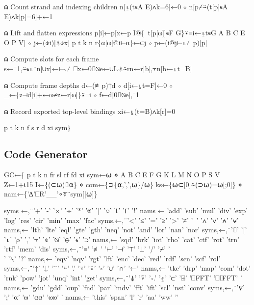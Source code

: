 \documentclass{article}%
\begin{document}
⍝ Count strand and indexing children
   n[⍸(t∊A E)∧k=6]←0 ⋄ n[p⌿⍨(t[p]∊A E)∧k[p]=6]+←1

⍝ Lift and flatten expressions
   p[i]←p[x←p I@\{~t[p[⍵]]∊F G\}⍣≡i←⍸t∊G A B C E O P V] ⋄ j←(⌽i)[⍋⌽x]
   p t k n r\{⍺[⍵]@i⊢⍺\}←⊂j ⋄ p←(i@j⊢⍳≢p)[p]

⍝ Compute slots for each frame
   s←¯1,⍨∊⍳¨n[∪x]←⊢∘≢⌸x←0⌷⍉e←∪I∘⍋⍨rn←r[b],⍪n[b←⍸t=B]

⍝ Compute frame depths
   d←(≢p)↑d ⋄ d[i←⍸t=F]←0 ⋄ _←\{z⊣d[i]+←⍵≠z←r[⍵]\}⍣≡i ⋄ f←d[0⌷⍉e],¯1

⍝ Record exported top-level bindings
   xi←⍸(t=B)∧k[r]=0

   p t k n f s r d xi sym\}
\nwendcode{}\nwdocspar

\subsection{Code Generator}

\nwenddocs{}\endmoddef\nwstartdeflinemarkup{}\nwenddeflinemarkup
GC←\{
  p t k n fr sl rf fd xi sym←⍵ ⋄ A B C E F G K L M N O P S V Z←1+⍳15
  I←\{(⊂⍵)⌷⍺\} ⋄ com←\{⊃\{⍺,',',⍵\}/⍵\}
  ks←\{⍵⊂[0]⍨(⊃⍵)=⍵[;0]\} ⋄ nam←\{'∆'⎕R'__'∘⍕¨sym[|⍵]\}

  syms ←,¨'+'    '-'    '×'   '÷'   '*'   '⍟'   '|'    '○'     '⌊'    '⌈'   '!'
  nams ←  'add'  'sub'  'mul' 'div' 'exp' 'log' 'res'  'cir'   'min'  'max' 'fac'
  syms,←,¨'<'    '≤'    '='   '≥'   '>'   '≠'   '~'    '∧'     '∨'    '⍲'   '⍱'
  nams,←  'lth'  'lte'  'eql' 'gte' 'gth' 'neq' 'not'  'and'   'lor'  'nan' 'nor'
  syms,←,¨'⌷'    '['    '⍳'   '⍴'   ','   '⍪'   '⌽'    '⍉'     '⊖'    '∊'   '⊃'
  nams,←  'sqd'  'brk'  'iot' 'rho' 'cat' 'ctf' 'rot'  'trn'   'rtf'  'mem' 'dis'
  syms,←,¨'≡'    '≢'    '⊢'   '⊣'   '⊤'   '⊥'   '/'    '⌿'     '\\'    '⍀'   '?'
  nams,←  'eqv'  'nqv'  'rgt' 'lft' 'enc' 'dec' 'red'  'rdf'   'scn'  'scf' 'rol'
  syms,←,¨'↑'    '↓'    '¨'   '⍨'   '.'   '⍤'   '⍣'    '∘'     '∪'    '∩'   '←'
  nams,←  'tke'  'drp'  'map' 'com' 'dot' 'rnk' 'pow'  'jot'   'unq'  'int' 'get'
  syms,←,¨'⍋'    '⍒'    '∘.'  '⍷'   '⊂'   '⌹'   '⎕FFT' '⎕IFFT' '%
  nams,←  'gdu'  'gdd'  'oup' 'fnd' 'par' 'mdv' 'fft'  'ift'   'scl'  'nst' 'conv'
  syms,←,¨'∇'    ';'    '⍺'   '⍵'   '⍺⍺'  '⍵⍵'  '%
  nams,←  'this' 'span' 'l'   'r'   'aa'  'ww'  ''
\end{document}

